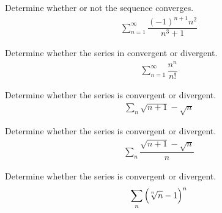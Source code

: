\begin{exercise}
Determine whether or not the sequence converges.
\begin{align*}
    \sum_{n=1}^{\infty} \dfrac{(-1)^{n+1}n^{2}}{n^{3} + 1}
\end{align*}
\end{exercise}

\begin{exercise}
Determine whether the series in convergent or divergent.
\begin{align*}
    \sum_{n=1}^{\infty} \dfrac{n^{n}}{n!}
\end{align*}
\end{exercise}

\begin{exercise}
Determine whether the series is convergent or divergent.
\begin{align*}
    \sum_{n} \sqrt{n+1} - \sqrt{n}
\end{align*}
\end{exercise}

\begin{exercise}
Determine whether the series is convergent or divergent.
\begin{align*}
    \sum_{n} \dfrac{\sqrt{n+1} - \sqrt{n}}{n}
\end{align*}
\end{exercise}

\begin{exercise}
Determine whether the series is convergent or divergent.
\begin{align*}
    \sum_{n} \Big(\sqrt[\leftroot{2}\uproot{2}n]{n} - 1\Big)^{n}
\end{align*}
\end{exercise}